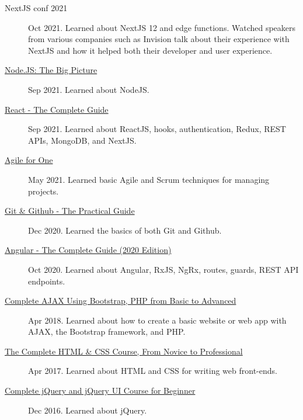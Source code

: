\documentclass{article}
\begin{document}
\begin{description}
  \item[NextJS conf 2021] Oct 2021. Learned about NextJS 12 and edge functions. Watched speakers from various companies such as Invision talk about their experience with NextJS and how it helped both their developer and user experience.
  \item[\href{https://sirkoik.github.io/CurriculumVitae/certifications/Nodejs-The-Big-Picture/certificate.pdf}{Node.JS: The Big Picture}] Sep 2021. Learned about NodeJS.
  \item[\href{https://www.udemy.com/certificate/UC-2196f0cf-2dce-4a11-9d8e-421827506ad1/}{React - The Complete Guide}] Sep 2021. Learned about ReactJS, hooks, authentication, Redux, REST APIs, MongoDB, and NextJS.
  \item[\href{https://sirkoik.github.io/CurriculumVitae/certifications/Agile-for-One/certificate.pdf}{Agile for One}] May 2021. Learned basic Agile and Scrum techniques for managing projects.
  \item[\href{https://sirkoik.github.io/CurriculumVitae/certifications/certificate-of-completion-for-git-github-the-practical-guide.pdf}{Git \& Github - The Practical Guide}] Dec 2020. Learned the basics of both Git and Github.
  \item[\href{https://www.udemy.com/certificate/UC-624f6f83-940e-428f-accd-d16113661ded}{Angular - The Complete Guide (2020 Edition)}] Oct 2020. Learned about Angular, RxJS, NgRx, routes, guards, REST API endpoints.
  \item[\href{https://www.udemy.com/certificate/UC-E3EMJE4O}{Complete AJAX Using Bootstrap, PHP from Basic to Advanced}] Apr 2018. Learned about how to create a basic website or web app with AJAX, the Bootstrap framework, and PHP.
  \item[\href{https://www.udemy.com/certificate/UC-QZDWYX3V}{The Complete HTML \& CSS Course, From Novice to Professional}] Apr 2017. Learned about HTML and CSS for writing web front-ends.
  \item[\href{https://www.udemy.com/certificate/UC-4V285L2N}{Complete jQuery and jQuery UI Course for Beginner}] Dec 2016. Learned about jQuery.
\end{description}
\end{document}
